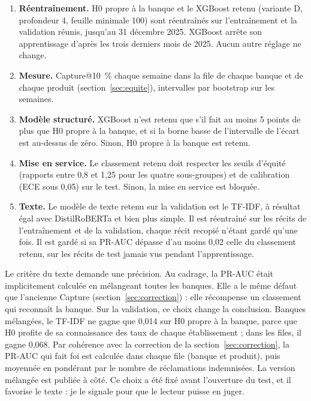 \documentclass[11pt,a4paper]{article}
\begin{document}
\begin{enumerate}
  \item \textbf{Réentraînement.} H0 propre à la banque et le XGBoost retenu (variante D, profondeur 4, feuille minimale 100) sont réentraînés sur l'entraînement et la validation réunis, jusqu'au 31 décembre 2025. XGBoost arrête son apprentissage d'après les trois derniers mois de 2025. Aucun autre réglage ne change.
  \item \textbf{Mesure.} Capture@10~\% chaque semaine dans la file de chaque banque et de chaque produit (section~\ref{sec:equite}), intervalles par bootstrap sur les semaines.
  \item \textbf{Modèle structuré.} XGBoost n'est retenu que s'il fait au moins 5 points de plus que H0 propre à la banque, et si la borne basse de l'intervalle de l'écart est au-dessus de zéro. Sinon, H0 propre à la banque est retenu.
  \item \textbf{Mise en service.} Le classement retenu doit respecter les seuils d'équité (rapports entre 0,8 et 1,25 pour les quatre sous-groupes) et de calibration (ECE sous 0,05) sur le test. Sinon, la mise en service est bloquée.
  \item \textbf{Texte.} Le modèle de texte retenu sur la validation est le TF-IDF, à résultat égal avec DistilRoBERTa et bien plus simple. Il est réentraîné sur les récits de l'entraînement et de la validation, chaque récit recopié n'étant gardé qu'une fois. Il est gardé si sa PR-AUC dépasse d'au moins 0,02 celle du classement retenu, sur les récits de test jamais vus pendant l'apprentissage.
\end{enumerate}

Le critère du texte demande une précision. Au cadrage, la PR-AUC était implicitement calculée en mélangeant toutes les banques. Elle a le même défaut que l'ancienne Capture (section~\ref{sec:correction}) : elle récompense un classement qui reconnaît la banque. Sur la validation, ce choix change la conclusion. Banques mélangées, le TF-IDF ne gagne que 0,014 sur H0 propre à la banque, parce que H0 profite de sa connaissance des taux de chaque établissement ; dans les files, il gagne 0,068. Par cohérence avec la correction de la section~\ref{sec:correction}, la PR-AUC qui fait foi est calculée dans chaque file (banque et produit), puis moyennée en pondérant par le nombre de réclamations indemnisées. La version mélangée est publiée à côté. Ce choix a été fixé avant l'ouverture du test, et il favorise le texte : je le signale pour que le lecteur puisse en juger.
\end{document}
